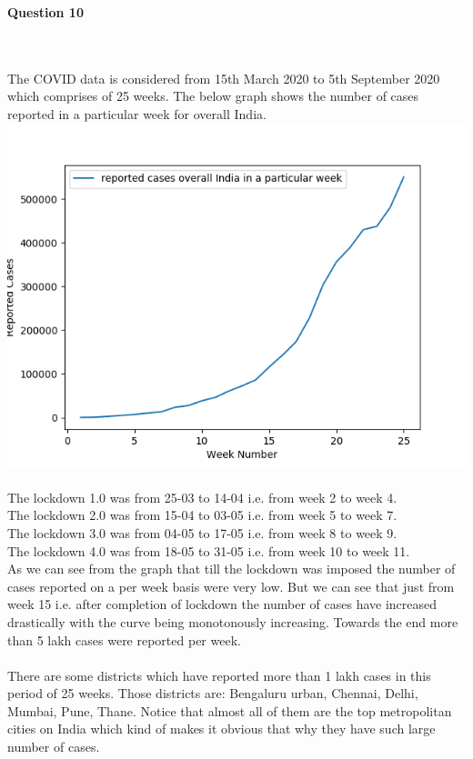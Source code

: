 \documentclass[20pt]{letter}
\begin{document}
\begin{enumerate}
{ \Large
\item \textbf{Question 10}
}
{ \fontsize{13}{13}\selectfont\\\\
The COVID data is considered from 15th March 2020 to 5th September 2020 which comprises of 25 weeks. The below graph shows the number of cases reported in a particular week for overall India.\\
\includegraphics[scale=0.8]{analysis2.png}\\\\
The lockdown 1.0 was from 25-03 to 14-04 i.e. from week 2 to week 4.\\
The lockdown 2.0 was from 15-04 to 03-05 i.e. from week 5 to week 7.\\
The lockdown 3.0 was from 04-05 to 17-05 i.e. from week 8 to week 9.\\
The lockdown 4.0 was from 18-05 to 31-05 i.e. from week 10 to week 11.\\
As we can see from the graph that till the lockdown was imposed the number of cases reported on a per week basis were very low. But we can see that just from week 15 i.e. after completion of lockdown the number of cases have increased drastically with the curve being monotonously increasing. Towards the end more than 5 lakh cases were reported per week.\\\\
There are some districts which have reported more than 1 lakh cases in this period of 25 weeks. Those districts are: Bengaluru urban, Chennai, Delhi, Mumbai, Pune, Thane. Notice that almost all of them are the top metropolitan cities on India which kind of makes it obvious that why they have such large number of cases.\\\\

}
\end{enumerate}
\end{document}
